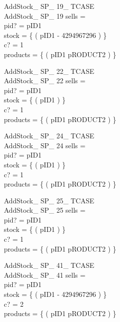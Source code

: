 \begin{schema}{AddStock\_ SP\_ 19\_ TCASE}\\
AddStock\_ SP\_ 19
\where
sells =~\emptyset \\
pid? = pID1 \\
stock = \{ ( pID1 \mapsto - 4294967296 ) \} \\
c? = 1 \\
products = \{ ( pID1 \mapsto pRODUCT2 ) \}
\end{schema}


\begin{schema}{AddStock\_ SP\_ 22\_ TCASE}\\
AddStock\_ SP\_ 22
\where
sells =~\emptyset \\
pid? = pID1 \\
stock = \{ ( pID1  ) \} \\
c? = 1 \\
products = \{ ( pID1 \mapsto pRODUCT2 ) \}
\end{schema}


\begin{schema}{AddStock\_ SP\_ 24\_ TCASE}\\
AddStock\_ SP\_ 24
\where
sells =~\emptyset \\
pid? = pID1 \\
stock = \{ ( pID1  ) \} \\
c? = 1 \\
products = \{ ( pID1 \mapsto pRODUCT2 ) \}
\end{schema}


\begin{schema}{AddStock\_ SP\_ 25\_ TCASE}\\
AddStock\_ SP\_ 25
\where
sells =~\emptyset \\
pid? = pID1 \\
stock = \{ ( pID1  ) \} \\
c? = 1 \\
products = \{ ( pID1 \mapsto pRODUCT2 ) \}
\end{schema}


\begin{schema}{AddStock\_ SP\_ 41\_ TCASE}\\
AddStock\_ SP\_ 41
\where
sells =~\emptyset \\
pid? = pID1 \\
stock = \{ ( pID1 \mapsto - 4294967296 ) \} \\
c? = 2 \\
products = \{ ( pID1 \mapsto pRODUCT2 ) \}
\end{schema}


